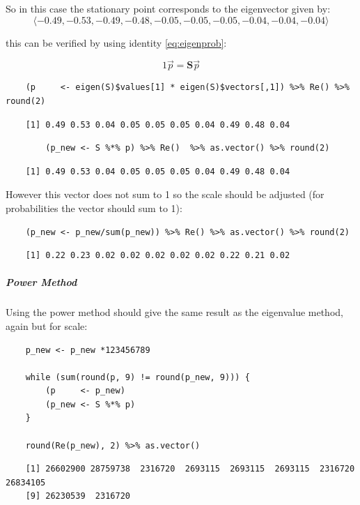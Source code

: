\documentclass[11pt, twoside]{report}
\begin{document}
So in this case the stationary point corresponds to the eigenvector given by:
\[
\langle -0.49, -0.53, -0.49, -0.48, -0.05, -0.05, -0.05, -0.04, -0.04, -0.04 \rangle
\]

this can be verified by using identity \eqref{eq:eigenprob}:

$$
1 \vec{p} = \mathbf{S}\vec{p}
$$

\begin{tcolorbox}
    \begin{verbatim}
    (p     <- eigen(S)$values[1] * eigen(S)$vectors[,1]) %>% Re() %>%  round(2)
    \end{verbatim}
\tcblower
    \begin{verbatim}
    [1] 0.49 0.53 0.04 0.05 0.05 0.05 0.04 0.49 0.48 0.04
    \end{verbatim}
\end{tcolorbox}

\begin{tcolorbox}
    \begin{verbatim}
        (p_new <- S %*% p) %>% Re()  %>% as.vector() %>% round(2)
    \end{verbatim}
 \tcblower
    \begin{verbatim}
    [1] 0.49 0.53 0.04 0.05 0.05 0.05 0.04 0.49 0.48 0.04
    \end{verbatim}
\end{tcolorbox}


However this vector does not sum to 1 so the scale should be adjusted
(for probabilities the vector should sum to 1):

\begin{tcolorbox}
    \begin{verbatim}
    (p_new <- p_new/sum(p_new)) %>% Re() %>% as.vector() %>% round(2)
    \end{verbatim}
\tcblower
    \begin{verbatim}
    [1] 0.22 0.23 0.02 0.02 0.02 0.02 0.02 0.22 0.21 0.02
    \end{verbatim}
\end{tcolorbox}

\subparagraph{Power Method}
\label{power-value-method}
Using the power method should give the same result as the eigenvalue method, again but for scale:

\begin{tcolorbox}
    \begin{verbatim}
    p_new <- p_new *123456789

    while (sum(round(p, 9) != round(p_new, 9))) {
        (p     <- p_new)
        (p_new <- S %*% p)
    }

    round(Re(p_new), 2) %>% as.vector()
    \end{verbatim}
\tcblower
    \begin{verbatim}
    [1] 26602900 28759738  2316720  2693115  2693115  2693115  2316720 26834105
    [9] 26230539  2316720
    \end{verbatim}
\end{tcolorbox}
\end{document}
